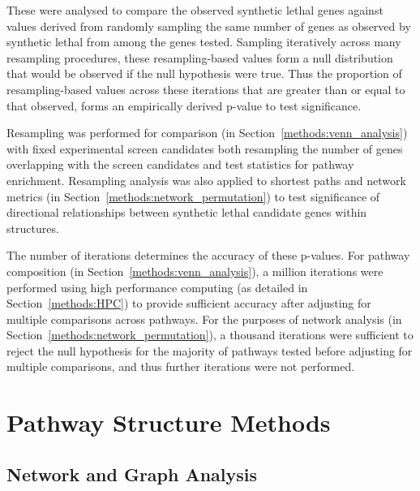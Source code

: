 These were analysed to compare the observed \gls{synthetic lethal} genes against values derived from randomly sampling the same number of genes as observed by \gls{synthetic lethal} from among the genes tested. Sampling iteratively across many resampling procedures, these resampling-based values form a null distribution that would be observed if the null hypothesis were true. Thus the proportion of resampling-based values across these iterations that are greater than or equal to that observed, forms an empirically derived p-value to test significance.

Resampling was performed for comparison (in Section~\ref{methods:venn_analysis}) with fixed experimental screen candidates \citep{Telford2015} both resampling the number of genes overlapping with the screen candidates and test statistics for \gls{pathway} enrichment. Resampling analysis was also applied to \glspl{shortest path} and network metrics (in Section~\ref{methods:network_permutation}) to test significance of directional relationships between \gls{synthetic lethal} candidate genes within  structures.

The number of iterations determines the accuracy of these p-values. For \gls{pathway} composition (in Section~\ref{methods:venn_analysis}), a million iterations were performed using high performance computing (as detailed in Section~\ref{methods:HPC}) to provide sufficient accuracy after adjusting for multiple comparisons across \glspl{pathway}. For the purposes of network analysis (in Section~\ref{methods:network_permutation}), a thousand iterations were sufficient to reject the null hypothesis for the majority of \glspl{pathway} tested before adjusting for multiple comparisons, and thus further iterations were not performed.

\section{Pathway Structure Methods}

\subsection{Network and Graph Analysis}

